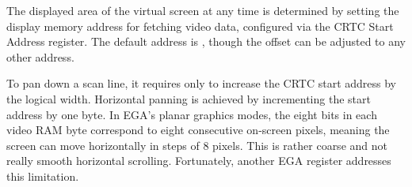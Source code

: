 \documentclass[book.tex]{subfiles}
\begin{document}
\begin{minipage}{\textwidth}
  
  \end{minipage}
  \label{ega_pel_pan}
  
\par
The displayed area of the virtual screen at any time is determined by setting the display memory address for fetching video data, configured via the CRTC Start Address register. The default address is , though the offset can be adjusted to any other address.\\


\begin{minipage}{\textwidth}
  
  \end{minipage}
  \label{ega_set_address}
  \par


\par
To pan down a scan line, it requires only to increase the CRTC start address by the logical width. Horizontal panning is achieved by incrementing the start address by one byte. In EGA's planar graphics modes, the eight bits in each video RAM byte correspond to eight consecutive on-screen pixels, meaning the screen can move horizontally in steps of 8 pixels. This is rather coarse and not really smooth horizontal scrolling. Fortunately, another EGA register addresses this limitation.\\
\end{document}
